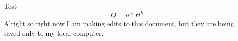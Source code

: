 \documentclass{article}
\title{}
\author{Luis Galindo}
\date{}
\begin{document}
\maketitle
Test
	\begin{equation}
	Q = a*H^b
	\end{equation}
Alright so right now I am making edits to this document, but they are being saved only to my local computer.
\newpage


\end{document}
